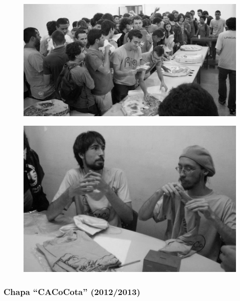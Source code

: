 \begin{figure}[H]
    \centering
    \includegraphics[scale=0.21]{img/caco/pizzada2.jpg}
\end{figure}

\begin{figure}[H]
    \centering
    \includegraphics[scale=0.24]{img/caco/eleicao.jpg}
\end{figure}

\subsubsection{Chapa ``CACoCota'' (2012/2013)}

